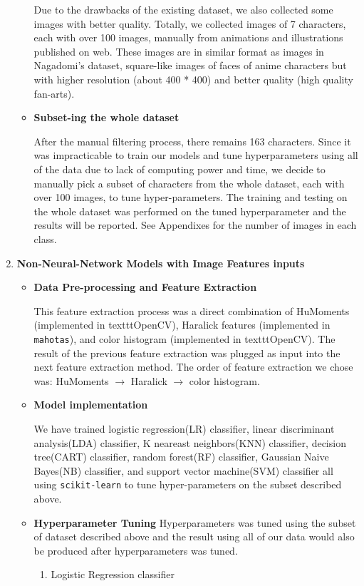 \documentclass[11.5pt]{article}
\begin{document}
\begin{enumerate}
\begin{itemize}
            Due to the drawbacks of the existing dataset, we also collected some images with better quality.
            Totally, we collected images of 7 characters, each with over 100 images, manually from animations and illustrations published on web.
            These images are in similar format as images in Nagadomi's dataset, square-like images of faces of anime characters but with higher resolution (about 400 * 400) and better quality (high quality fan-arts).
            \item \textbf{Subset-ing the whole dataset}

            After the manual filtering process, there remains 163 characters.
            Since it was impracticable to train our models and tune hyperparameters using all of the data due to lack of computing power and time, we decide to manually pick a subset of characters from the whole dataset, each with over 100 images, to tune hyper-parameters.
            The training and testing on the whole dataset was performed on the tuned hyperparameter and the results will be reported.
            See Appendixes for the number of images in each class.
        \end{itemize}
        \item \textbf{Non-Neural-Network Models with Image Features inputs}
        \begin{itemize}
            \item \textbf{Data Pre-processing and Feature Extraction}

            This feature extraction process was a direct combination of HuMoments (implemented in texttt{OpenCV}\cite{opencv_library}), Haralick features (implemented in \texttt{mahotas}\cite{mahotas}), and color histogram (implemented in texttt{OpenCV}\cite{opencv_library}).
            The result of the previous feature extraction was plugged as input into the next feature extraction method.
            The order of feature extraction we chose was: HuMoments $\rightarrow$ Haralick $\rightarrow$ color histogram.
            \item \textbf{Model implementation}

            We have trained logistic regression(LR) classifier, linear discriminant analysis(LDA) classifier, K neareast neighbors(KNN) classifier, decision tree(CART) classifier, random forest(RF) classifier, Gaussian Naive Bayes(NB) classifier, and support vector machine(SVM) classifier all using \texttt{scikit-learn}\cite{scikit-learn} to tune hyper-parameters on the subset described above.
            \item \textbf{Hyperparameter Tuning}
            Hyperparameters was tuned using the subset of dataset described above and the result using all of our data would also be produced after hyperparameters was tuned.
            \begin{enumerate}
                \item Logistic Regression classifier


\end{enumerate}
\end{itemize}
\end{enumerate}
\end{document}

